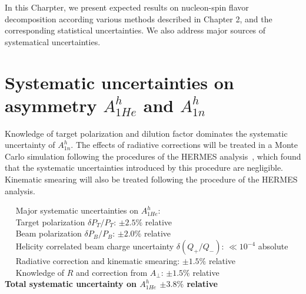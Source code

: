 
In this Charpter, we present expected results on nucleon-spin flavor decomposition according various methods described in Chapter 2, and 
the corresponding statistical uncertainties.  We also address major sources of systematical uncertainties.

\section{Systematic uncertainties on asymmetry $A_{1He}^h$ and $A_{1n}^h$}

Knowledge of target polarization and dilution factor dominates the systematic uncertainty of $A_{1n}^h$.
The effects of radiative corrections will be treated in a Monte Carlo simulation
following the procedures of the HERMES analysis~\cite{hermes2002}, which found that the 
systematic uncertainties introduced by this procedure are negligible.  
Kinematic smearing will also be treated following the procedure of the HERMES analysis. 

\vspace{5.0mm}
\noindent ~\hspace{0.25cm} ~Major systematic uncertainties on $A_{1He}^h$:  \\
\noindent ~\hspace{0.25cm} ~Target polarization $\delta P_T/P_T$:  \hfill           $\pm 2.5\%$  relative \\ 
\noindent ~\hspace{0.25cm} ~Beam polarization $\delta P_B/P_B$:    \hfill           $\pm 2.0 \%$ relative \\
\noindent ~\hspace{0.25cm} ~Helicity correlated beam charge uncertainty $\delta (Q_+/Q_-)$:   \hfill  $\ll 10^{-4}$ absolute \\
\noindent ~\hspace{0.25cm} ~Radiative correction and kinematic smearing:                \hfill           $\pm 1.5 \%$  relative \\
\noindent ~\hspace{0.25cm} ~Knowledge of $R$ and correction from $A_{\perp}$:                \hfill           $\pm 1.5 \%$  relative \\
\vspace{-3.0mm}
{\bf 
\noindent \hspace{0.5cm} Total systematic uncertainty on $A_{1He}^h$  \hfill          $\pm 3.8 \%$  relative } \\

